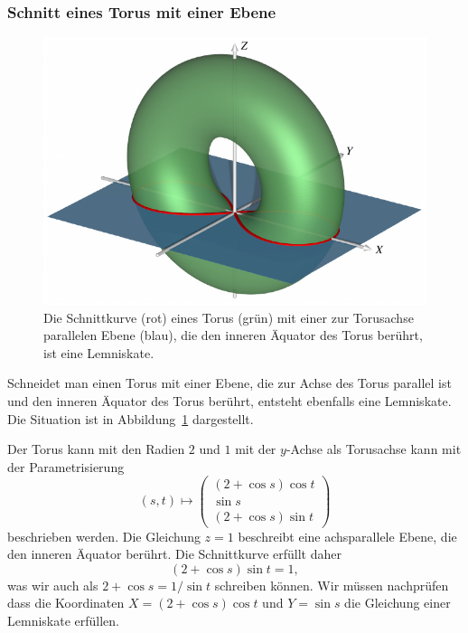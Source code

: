 \subsubsection{Schnitt eines Torus mit einer Ebene}
\begin{figure}
\centering
\includegraphics{chapters/110-elliptisch/images/torusschnitt.pdf}
\caption{Die Schnittkurve (rot) eines Torus (grün)
mit einer zur Torusachse parallelen Ebene (blau),
die den inneren Äquator des Torus berührt, ist eine Lemniskate.
\label{buch:elliptisch:lemniskate:torusschnitt}}
\end{figure}
Schneidet man einen Torus mit einer Ebene, die zur Achse des Torus
parallel ist und den inneren Äquator des Torus berührt, entsteht
ebenfalls eine Lemniskate.
Die Situation ist in Abbildung~\ref{buch:elliptisch:lemniskate:torusschnitt}
dargestellt.

Der Torus kann mit den Radien $2$ und $1$ mit der $y$-Achse als Torusachse
kann mit der Parametrisierung
\[
(s,t)
\mapsto
\begin{pmatrix}
(2+\cos s) \cos t \\
\sin s \\
(2+\cos s) \sin t 
\end{pmatrix}
\]
beschrieben werden.
Die Gleichung $z=1$ beschreibt eine 
achsparallele Ebene, die den inneren Äquator berührt.
Die Schnittkurve erfüllt daher
\[
(2+\cos s)\sin t = 1,
\]
was wir auch als $2 +\cos s = 1/\sin t$ schreiben können.
Wir müssen nachprüfen dass die Koordinaten
$X=(2+\cos s)\cos t$ und $Y=\sin s$ die Gleichung einer Lemniskate
erfüllen.


